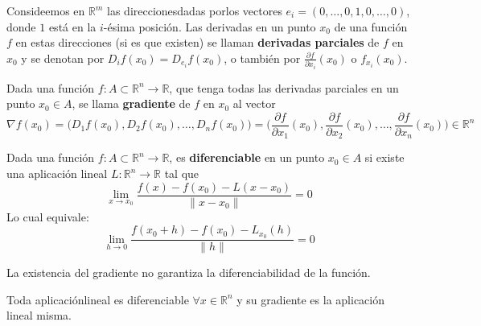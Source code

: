 \begin{definición}
    Consideemos en $\mathbb{R}^m$ las direccionesdadas porlos vectores $e_i = (0,\ldots,0,1,0,\ldots,0)$, donde $1$ está en la $i$-ésima posición. 
    Las derivadas en un punto $x_0$ de una función $f$ en estas direcciones (si es que existen) se llaman \textbf{derivadas parciales} de $f$ en $x_0$ y se denotan por $D_if(x_0) = D_{e_i}f(x_0)$, o también por $\frac{\partial f}{\partial x_i}(x_0)$ o $f_{x_i}(x_0)$. 
\end{definición}

\begin{definición}[Gradiente]
    Dada una función $f:A \subset \mathbb{R}^n \to \mathbb{R}$, que tenga todas las derivadas parciales en un punto $x_0\in A$, se llama \textbf{gradiente} de $f$ en $x_0$ al vector
    $$ \nabla f(x_0) = \bigl(D_1f(x_0), D_2f(x_0), \ldots, D_nf(x_0)\bigr) = \bigl(\frac{\partial f}{\partial x_1}(x_0), \frac{\partial f}{\partial x_2}(x_0), \ldots, \frac{\partial f}{\partial x_n}(x_0)\bigr) \in \mathbb{R}^n $$
\end{definición}

\begin{definición}[Diferenciable]
    Dada una función $f:A \subset \mathbb{R}^n \to \mathbb{R}$, es \textbf{diferenciable} en un punto $x_0\in A$ si existe una aplicación lineal $L:\mathbb{R}^n\to\mathbb{R}$ tal que
    $$ \lim_{x\to x_0} \frac{f(x) - f(x_0) - L(x-x_0)}{\|x-x_0\|} = 0 $$
    Lo cual equivale: 
    $$ \lim_{h \to 0} \frac{f(x_0 + h) - f(x_0) - L_{x_0}(h)}{\|h\|} = 0 $$
\end{definición}

\begin{observación}
    La existencia del gradiente no garantiza la diferenciabilidad de la función. 
\end{observación}

\begin{proposición}
    Toda aplicaciónlineal es diferenciable $\forall x \in \mathbb{R}^n$ y su gradiente es la aplicación lineal misma.
\end{proposición}

